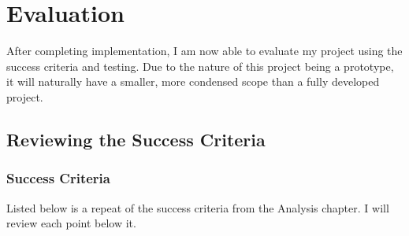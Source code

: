 \chapter{Evaluation}
After completing implementation, I am now able to evaluate my project using the success criteria and testing.
Due to the nature of this project being a prototype, it will naturally have a smaller, more condensed scope than a fully developed project. 
\section{Reviewing the Success Criteria}
\subsection{Success Criteria}
Listed below is a repeat of the success criteria from the Analysis chapter. I will review each point below it.

